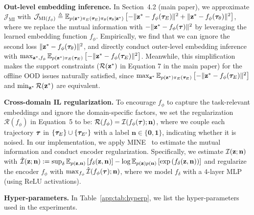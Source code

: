 \textbf{Out-level embedding inference.} In Section~4.2 (main paper), we approximate $\mathcal{J}_{\text{MI}}$ with $\mathcal{J}_{\text{MI}(f_\phi)} \triangleq \mathbb{E}_{p({\mathbf{z}}^*)\pi_E({\bm{\tau}}_E)\pi_\theta({\bm{\tau}}_\theta|{\mathbf{z}}^*)} \left[ - \Vert{\mathbf{z}}^*-f_\phi({\bm{\tau}}_E)\Vert^2 + \Vert{\mathbf{z}}^*-f_\phi({\bm{\tau}}_\theta)\Vert^2 \right]$, where we replace the mutual information with $- \Vert{\mathbf{z}}^*-f_\phi({\bm{\tau}})\Vert^2$ by leveraging the learned embedding function $f_\phi$. Empirically, we find that we can ignore the second loss $\Vert{\mathbf{z}}^*-f_\phi({\bm{\tau}}_\theta)\Vert^2$, and directly conduct outer-level embedding inference with $\max_{{\mathbf{z}}^*, f_\phi} \mathbb{E}_{p({\mathbf{z}}^*)\pi_E({\bm{\tau}}_E)} \left[ - \Vert{\mathbf{z}}^*-f_\phi({\bm{\tau}}_E)\Vert^2 \right]$. Meanwhile, this simplification makes the support constraints ($\mathcal{R}({\mathbf{z}}^*)$ in Equation 7 in the main paper) for the offline OOD issues naturally satisfied, since $\max_{{\mathbf{z}}^*} \mathbb{E}_{p({\mathbf{z}}^*)\pi_E({\bm{\tau}}_E)} \left[ - \Vert{\mathbf{z}}^*-f_\phi({\bm{\tau}}_E)\Vert^2 \right]$ and $\min_{{\mathbf{z}}^*} \mathcal{R}({\mathbf{z}}^*)$ are equivalent. 


\textbf{Cross-domain IL regularization.}  
To encourage $f_\phi$ to capture the task-relevant embeddings and ignore the domain-specific factors, we set the regularization $\mathcal{R}(f_\phi)$ in Equation~5 to be:
$\mathcal{R}(f_\phi)  = \mathcal{I}(f_\phi({\bm{\tau}}); \mathbf{n})$, where we couple each trajectory ${\bm{\tau}}$ in $\{{\bm{\tau}}_{E}\}\cup\{{\bm{\tau}}_{E'}\}$ with a label $\mathbf{n} \in \{\mathbf{0}, \mathbf{1}\}$, indicating whether it is noised. 
In our implementation, we apply MINE~\citep{belghazi2018mine} to estimate the mutual information and conduct encoder regularization. Specifically, we estimate $\mathcal{I}({\mathbf{z}}; {\mathbf{n}})$ with $\hat{\mathcal{I}}({\mathbf{z}}; {\mathbf{n}}) := \sup_\delta \mathbb{E}_{p({\mathbf{z}}, {\mathbf{n}})} \left[f_\delta({\mathbf{z}}, {\mathbf{n}})\right] - \log \mathbb{E}_{p({\mathbf{z}})p({\mathbf{n}})} \left[\exp{(f_\delta({\mathbf{z}}, {\mathbf{n}}))}\right]$ and regularize the encoder $f_\phi$ with $\max_{f_\phi} \hat{\mathcal{I}}(f_\phi({\bm{\tau}}); \mathbf{n})$, where we model $f_\delta$ with a 4-layer MLP (using ReLU activations). 


\textbf{Hyper-parameters.} 
In Table~\ref{app:tab:hyperp}, we list the hyper-parameters used in the experiments. 


